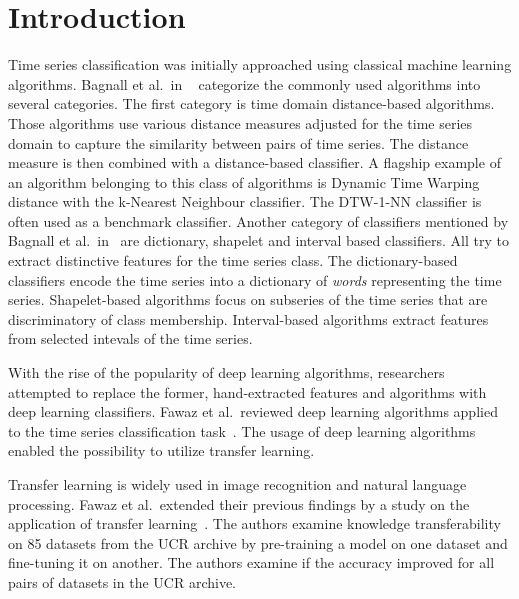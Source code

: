 \documentclass[a4paper,11pt,twoside]{report}
\theoremstyle{definition}
\begin{document}
\chapter{Introduction}
Time series classification was initially approached using classical machine learning algorithms. Bagnall et al.~in ~\cite{bake_off} categorize the commonly used algorithms into several categories. The first category is time domain distance-based algorithms. Those algorithms use various distance measures adjusted for the time series domain to capture the similarity between pairs of time series. The distance measure is then combined with a distance-based classifier. A flagship example of an algorithm belonging to this class of algorithms is Dynamic Time Warping distance with the k-Nearest Neighbour classifier. The DTW-1-NN classifier is often used as a benchmark classifier. Another category of classifiers mentioned by Bagnall et al.~in~\cite{bake_off} are dictionary, shapelet and interval based classifiers. All try to extract distinctive features for the time series class. The dictionary-based classifiers encode the time series into a dictionary of \textit{words} representing the time series. Shapelet-based algorithms focus on subseries of the time series that are discriminatory of class membership. Interval-based algorithms extract features from selected intevals of the time series.

With the rise of the popularity of deep learning algorithms, researchers attempted to replace the former, hand-extracted features and algorithms with deep learning classifiers. Fawaz et al.~reviewed deep learning algorithms applied to the time series classification task~\cite{dl_tsc}. The usage of deep learning algorithms enabled the possibility to utilize transfer learning.

Transfer learning is widely used in image recognition and natural language processing. Fawaz et al.~extended their previous findings by a study on the application of transfer learning~\cite{dl_tsc}. The authors examine knowledge transferability on 85 datasets from the UCR archive by pre-training a model on one dataset and fine-tuning it on another. The authors examine if the accuracy improved for all pairs of datasets in the UCR archive.
\end{document}
